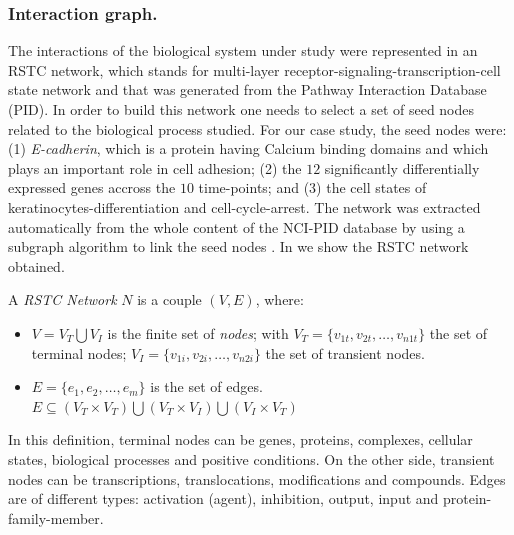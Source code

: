 \subsubsection{Interaction graph.}
\label{ssec:RSTC}
The interactions of the biological system under study were represented in
 an RSTC network, which stands for  multi-layer receptor-signaling-transcription-cell state network and that was generated from the Pathway Interaction Database (PID).
In order to build this network one needs to select a set of seed nodes related to the biological process studied.
For our case study, the seed nodes were:  (1) \emph{E-cadherin}, which is a protein having Calcium binding domains and which plays an important role in cell adhesion;
(2) the $12$ significantly differentially expressed genes accross the $10$ time-points; and (3) the cell states of keratinocytes-differentiation and cell-cycle-arrest. 
The network was extracted automatically from the whole content of the NCI-PID database by using a subgraph algorithm to link the seed nodes \cite{guziolowski2012automatic}. 
In  we show the RSTC network obtained. 

\begin{definition} \label{def:RSTCDef}
A \emph{RSTC Network} $N$ is a couple $(V,E)$, where:
\begin{itemize}
\item $V =V_{T} \bigcup V_{I} $ is the finite set of \emph{nodes};
 with 
  $V_{T} = \{v_{1t},v_{2t}, \dots ,v_{n1t} \} $ the set of terminal nodes;
  $V_{I} = \{v_{1i},v_{2i}, \dots ,v_{n2i} \} $ the set of transient nodes.
\item $E = \{e_{1},e_{2}, \dots, e_{m} \}$ is the set of edges. $ E \subseteq (V_{T} \times V_{T}) \bigcup (V_{T} \times V_{I}) 
\bigcup (V_{I} \times V_{T})$
\end{itemize}
\end{definition}

In this definition, terminal nodes can be genes, proteins, complexes, cellular states, biological processes and positive conditions. 
On the other side, transient nodes can be transcriptions, translocations, modifications and compounds. Edges are of different types:
activation (agent), inhibition, output, input and protein-family-member.

